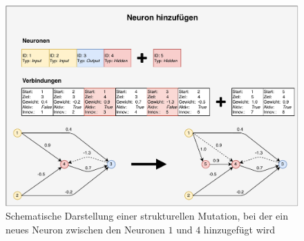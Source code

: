 \begin{figure}[!h]
	\centering
	\includegraphics[width=1\textwidth]{./img/neat-AddNodeMutation.pdf} 
	\caption{Schematische Darstellung einer strukturellen Mutation, bei der ein neues Neuron zwischen den Neuronen $1$ und $4$ hinzugefügt wird}
	\label{fig:neat_add_node_mutation}
\end{figure}
